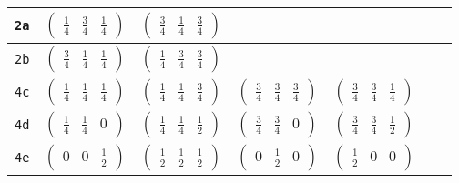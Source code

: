 \documentclass[fleqn,9pt,landscape]{jsarticle}
\begin{document}
\begin{center}
\begin{longtable}{ccccccc}
{\tt 2a} & $ \begin{pmatrix} \frac{1}{4} & \frac{3}{4} & \frac{1}{4} \end{pmatrix} $ & $ \begin{pmatrix} \frac{3}{4} & \frac{1}{4} & \frac{3}{4} \end{pmatrix} $ & $  $ & $  $ & $  $ & $  $ \\ \hline
{\tt 2b} & $ \begin{pmatrix} \frac{3}{4} & \frac{1}{4} & \frac{1}{4} \end{pmatrix} $ & $ \begin{pmatrix} \frac{1}{4} & \frac{3}{4} & \frac{3}{4} \end{pmatrix} $ & $  $ & $  $ & $  $ & $  $ \\ \hline
{\tt 4c} & $ \begin{pmatrix} \frac{1}{4} & \frac{1}{4} & \frac{1}{4} \end{pmatrix} $ & $ \begin{pmatrix} \frac{1}{4} & \frac{1}{4} & \frac{3}{4} \end{pmatrix} $ & $ \begin{pmatrix} \frac{3}{4} & \frac{3}{4} & \frac{3}{4} \end{pmatrix} $ & $ \begin{pmatrix} \frac{3}{4} & \frac{3}{4} & \frac{1}{4} \end{pmatrix} $ & $  $ & $  $ \\ \hline
{\tt 4d} & $ \begin{pmatrix} \frac{1}{4} & \frac{1}{4} & 0 \end{pmatrix} $ & $ \begin{pmatrix} \frac{1}{4} & \frac{1}{4} & \frac{1}{2} \end{pmatrix} $ & $ \begin{pmatrix} \frac{3}{4} & \frac{3}{4} & 0 \end{pmatrix} $ & $ \begin{pmatrix} \frac{3}{4} & \frac{3}{4} & \frac{1}{2} \end{pmatrix} $ & $  $ & $  $ \\ \hline
{\tt 4e} & $ \begin{pmatrix} 0 & 0 & \frac{1}{2} \end{pmatrix} $ & $ \begin{pmatrix} \frac{1}{2} & \frac{1}{2} & \frac{1}{2} \end{pmatrix} $ & $ \begin{pmatrix} 0 & \frac{1}{2} & 0 \end{pmatrix} $ & $ \begin{pmatrix} \frac{1}{2} & 0 & 0 \end{pmatrix} $ & $  $ & $  $ \\ \hline

\end{longtable}
\end{center}
\end{document}
